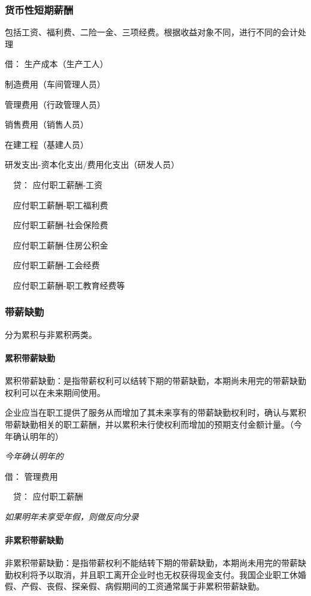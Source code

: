 \documentclass[UTF8,12pt]{ctexart}
\newenvironment{Dr}{\noindent 借：}{\par}
\newenvironment{Cr}{\noindent \ \ 贷：}{\par}
\numberwithin{equation}{section} %
\numberwithin{figure}{section}
\numberwithin{table}{section}
\begin{document}
	\subsubsection{货币性短期薪酬}
	包括工资、福利费、二险一金、三项经费。根据收益对象不同，进行不同的会计处理
	
	\begin{Dr}
		生产成本（生产工人）
		
		制造费用（车间管理人员）
		
		管理费用（行政管理人员）
		
		销售费用（销售人员）
		
		在建工程（基建人员）
		
		研发支出-资本化支出/费用化支出（研发人员）
	\end{Dr}
	\begin{Cr}
		应付职工薪酬-工资
		
		\ \ 应付职工薪酬-职工福利费
		
		\ \ 应付职工薪酬-社会保险费
		
		\ \ 应付职工薪酬-住房公积金
		
		\ \ 应付职工薪酬-工会经费
		
		\ \ 应付职工薪酬-职工教育经费等
	\end{Cr}

	\subsubsection{带薪缺勤}
	
	分为累积与非累积两类。
	
	\paragraph{累积带薪缺勤}累积带薪缺勤：是指带薪权利可以结转下期的带薪缺勤，本期尚未用完的带薪缺勤权利可以在未来期间使用。
	
	企业应当在职工提供了服务从而增加了其未来享有的带薪缺勤权利时，确认与累积带薪缺勤相关的职工薪酬，并以累积未行使权利而增加的预期支付金额计量。（今年确认明年的）
	
	\textit{今年确认明年的}
	
	\begin{Dr}
		管理费用
	\end{Dr}
	\begin{Cr}
		应付职工薪酬
	\end{Cr}

	\textit{如果明年未享受年假，则做反向分录}
	
	\paragraph{非累积带薪缺勤}非累积带薪缺勤：是指带薪权利不能结转下期的带薪缺勤，本期尚未用完的带薪缺勤权利将予以取消，并且职工离开企业时也无权获得现金支付。我国企业职工休婚假、产假、丧假、探亲假、病假期间的工资通常属于非累积带薪缺勤。
	
\end{document}
